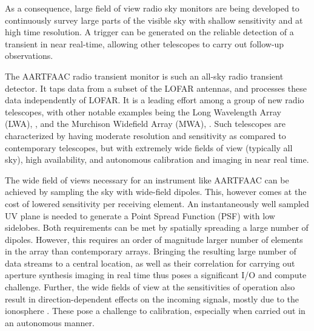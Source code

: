 \documentclass{ws-jai}
\begin{document}
As a consequence, large field of view  radio sky monitors are being developed to
continuously survey large parts of the  visible sky with shallow sensitivity and
at high time  resolution.  A trigger can be generated  on the reliable detection
of  a transient  in  near  real-time, allowing  other  telescopes  to carry  out
follow-up observations.


The  AARTFAAC  radio  transient  monitor  is such  an  all-sky  radio  transient
detector. It taps data from a subset  of the LOFAR antennas, and processes these
data independently of LOFAR.  It is a leading effort among a  group of new radio
telescopes, with other  notable examples being the Long  Wavelength Array (LWA),
\cite{ellingsonLWA1},   and  the   Murchison   Widefield   Array  (MWA),   \cite
     {tingay2013murchison}.   Such   telescopes  are  characterized   by  having
     moderate resolution and sensitivity as compared to contemporary telescopes,
     but  with  extremely  wide  fields   of  view  (typically  all  sky),  high
     availability, and autonomous calibration and imaging in near real time.

The  wide field  of  views necessary  for  an instrument  like  AARTFAAC can  be
achieved by sampling the sky with wide-field dipoles. This, however comes at the
cost  of lowered  sensitivity per  receiving element.   An instantaneously  well
sampled UV plane  is needed to generate  a Point Spread Function  (PSF) with low
sidelobes.  Both requirements  can be met by spatially spreading  a large number
of  dipoles.  However,  this requires  an order  of magnitude  larger number  of
elements in  the array than  contemporary arrays.  Bringing the  resulting large
number of data streams  to a central location, as well  as their correlation for
carrying out  aperture synthesis imaging in  real time thus poses  a significant
I/O and compute challenge. Further, the wide fields of view at the sensitivities
of operation also result in direction-dependent effects on the incoming signals,
mostly              due              to              the              ionosphere
\citep{intema2009ionospheric,wijnholds2010calibration}.  These  pose a challenge
to calibration, especially when carried out in an autonomous manner.
\end{document}
